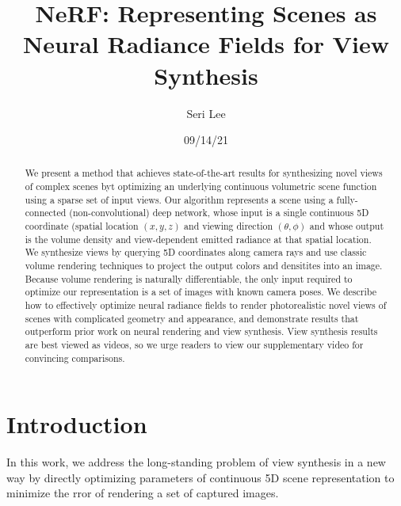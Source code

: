 \documentclass[12pt]{article}
\begin{document}
\title{NeRF: Representing Scenes as Neural Radiance Fields for View Synthesis}
\author{Seri Lee}
\date{09/14/21}

\maketitle

\begin{abstract}
We present a method that achieves state-of-the-art results for synthesizing novel views of complex scenes
byt optimizing an underlying continuous volumetric scene function using a sparse set of input views.
Our algorithm represents a scene using a fully-connected (non-convolutional) deep network, 
whose input is a single continuous 5D coordinate (spatial location $(x,y,z)$ and viewing direction $(\theta,\phi)$
and whose output is the volume density and view-dependent emitted radiance at that spatial location. We synthesize 
views by querying 5D coordinates along camera rays and use classic volume rendering techniques to project the output colors 
and densitites into an image. Because volume rendering is naturally differentiable, the only input required to optimize our representation
is a set of images with known camera poses. We describe how to effectively optimize neural radiance fields to render photorealistic 
novel views of scenes with complicated geometry and appearance, and demonstrate results that outperform prior work on neural rendering and 
view synthesis. View synthesis results are best viewed as videos, so we urge readers to view our supplementary video for convincing comparisons.
\end{abstract}

\section{Introduction}
In this work, we address the long-standing problem of view synthesis in a new way by directly optimizing parameters of continuous 5D scene representation 
to minimize the rror of rendering a set of captured images.
\end{document}
